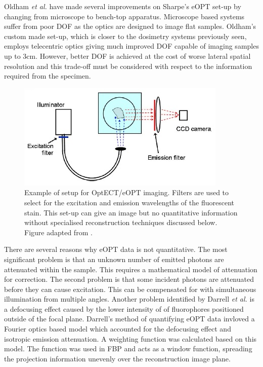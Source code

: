 \documentclass[12pt]{article}
\begin{document}
Oldham \textit{et al.} have made several improvements  on Sharpe's eOPT set-up by changing from microscope to bench-top apparatus.\cite{Oldham:2006, Oldham:2007ku} Microscope based systems suffer from poor DOF as the optics are designed to image flat samples.  Oldham's custom made set-up, which is closer to the dosimetry systems previously seen, employs telecentric optics giving much improved DOF capable of imaging samples up to 3cm. \cite{Oldham:2007ku} However, better DOF is achieved at the cost of worse lateral spatial resolution and this trade-off must be considered with respect to the information required from the specimen. \cite{Krstajic:2006kna}    


\begin{figure}[H]
\centering
\includegraphics[scale=1]{Oldham_2007ku_eCTsetup.jpg}
\caption{Example of setup for OptECT/eOPT imaging. Filters are used to select for the excitation and emission wavelengths of the fluorescent stain. This set-up can give an image but no quantitative information without specialised reconstruction techniques discussed below. Figure adapted from \cite{Oldham:2007ku}.}
\label{fig:eOPTsetup}
\end{figure}







There are several reasons why eOPT data is not quantitative. The most significant problem is that an unknown number of emitted photons are attenuated within the sample. This requires a mathematical model of attenuation for correction. The second problem is that some incident photons are attenuated before they can cause excitation.  This can be compensated for with simultaneous illumination from multiple angles.\cite{Kim:2008eua}  Another problem identified by Darrell \textit{et al.} is a defocusing effect caused by the lower intensity of of fluorophores positioned outside of the focal plane. Darrell's method of quantifying eOPT data invloved a Fourier optics based model which accounted for the defocusing effect and isotropic emission attenuation. \cite{Darrell:2008gd} A weighting function was calculated based on this model. The function was used in FBP and acts as a window function, spreading the projection information unevenly over the reconstruction image plane.
\end{document}
